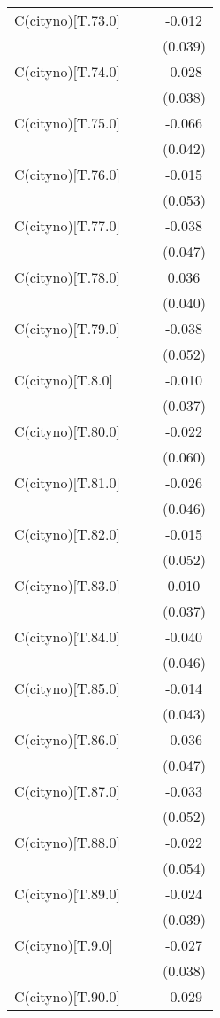\begin{table}[!htbp]
\begin{tabular}{@{\extracolsep{5pt}}lccc}
 C(cityno)[T.73.0] & & & -0.012$^{}$ \\
& & & (0.039) \\
 C(cityno)[T.74.0] & & & -0.028$^{}$ \\
& & & (0.038) \\
 C(cityno)[T.75.0] & & & -0.066$^{}$ \\
& & & (0.042) \\
 C(cityno)[T.76.0] & & & -0.015$^{}$ \\
& & & (0.053) \\
 C(cityno)[T.77.0] & & & -0.038$^{}$ \\
& & & (0.047) \\
 C(cityno)[T.78.0] & & & 0.036$^{}$ \\
& & & (0.040) \\
 C(cityno)[T.79.0] & & & -0.038$^{}$ \\
& & & (0.052) \\
 C(cityno)[T.8.0] & & & -0.010$^{}$ \\
& & & (0.037) \\
 C(cityno)[T.80.0] & & & -0.022$^{}$ \\
& & & (0.060) \\
 C(cityno)[T.81.0] & & & -0.026$^{}$ \\
& & & (0.046) \\
 C(cityno)[T.82.0] & & & -0.015$^{}$ \\
& & & (0.052) \\
 C(cityno)[T.83.0] & & & 0.010$^{}$ \\
& & & (0.037) \\
 C(cityno)[T.84.0] & & & -0.040$^{}$ \\
& & & (0.046) \\
 C(cityno)[T.85.0] & & & -0.014$^{}$ \\
& & & (0.043) \\
 C(cityno)[T.86.0] & & & -0.036$^{}$ \\
& & & (0.047) \\
 C(cityno)[T.87.0] & & & -0.033$^{}$ \\
& & & (0.052) \\
 C(cityno)[T.88.0] & & & -0.022$^{}$ \\
& & & (0.054) \\
 C(cityno)[T.89.0] & & & -0.024$^{}$ \\
& & & (0.039) \\
 C(cityno)[T.9.0] & & & -0.027$^{}$ \\
& & & (0.038) \\
 C(cityno)[T.90.0] & & & -0.029$^{}$ \\

\end{tabular}
\end{table}
